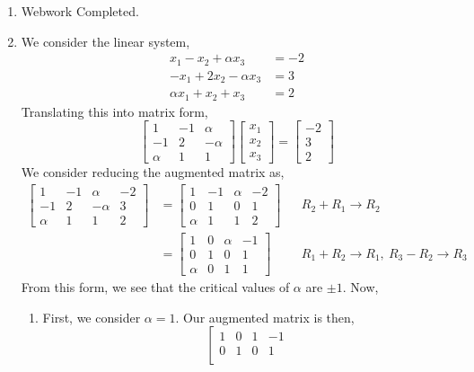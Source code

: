 \documentclass[letterpaper,10pt]{article}
\begin{document}
\begin{enumerate}
\item Webwork Completed.
\item We consider the linear system,
\begin{align*}
x_1-x_2+\alpha x_3 &= -2\\
-x_1+2x_2-\alpha x_3 &= 3\\
\alpha x_1+x_2+x_3 &= 2
\end{align*}
Translating this into matrix form,
\[\begin{bmatrix}
1 & -1 & \alpha\\
-1 & 2 & -\alpha\\
\alpha & 1 & 1
\end{bmatrix}\begin{bmatrix}
x_1\\x_2\\x_3
\end{bmatrix}=\begin{bmatrix}
-2\\3\\2
\end{bmatrix} \]
We consider reducing the augmented matrix as,
\begin{align*}
\left[\begin{array}{ccc|c}
1 & -1 & \alpha & -2\\
-1 & 2 & -\alpha & 3\\
\alpha & 1 & 1 & 2
\end{array}\right] &= \left[\begin{array}{ccc|c}
1 & -1 & \alpha & -2\\
0 & 1 & 0 & 1\\
\alpha & 1 & 1 & 2
\end{array}\right] && R_2+R_1\to R_2\\
&=  \left[\begin{array}{ccc|c}
1 & 0 & \alpha & -1\\
0 & 1 & 0 & 1\\
\alpha & 0 & 1 & 1
\end{array}\right] && R_1+R_2\to R_1,\ R_3-R_2\to R_3
\end{align*}
From this form, we see that the critical values of $\alpha$ are $\pm 1$. Now,
\begin{enumerate}
\item First, we consider $\alpha=1$. Our augmented matrix is then,
\[\left[\begin{array}{ccc|c}
1 & 0 & 1 & -1\\
0 & 1 & 0 & 1\\

\end{array}\]
\end{enumerate}
\end{enumerate}
\end{document}
